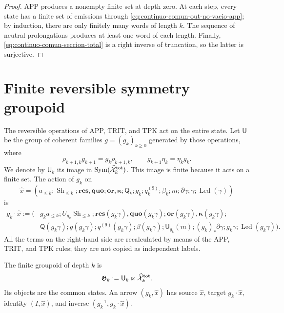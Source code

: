 \begin{proof}
APP produces a nonempty finite set at depth zero. At each step,
every state has a finite set of emissions through
\eqref{eq:continuo-comun-out-no-vacio-app}; by induction, there are only finitely many
words of length \(k\). The sequence of neutral prolongations
produces at least one word of each length. Finally,
\eqref{eq:continuo-comun-seccion-total} is a right inverse of
truncation, so the latter is surjective.
\end{proof}

\section{Finite reversible symmetry groupoid}
\label{sec:continuo-comun-groupoide}

The reversible operations of APP, TRIT, and TPK act on the entire state.
Let \(\mathsf U\) be the group of coherent families
\(g=(g_k)_{k\geq0}\) generated by those operations, where
\begin{equation}
\label{eq:continuo-comun-simetria-coherente}
 \rho_{k+1,k}g_{k+1}=g_k\rho_{k+1,k},
 \qquad
 g_{k+1}\eta_k=\eta_kg_k.
\end{equation}
We denote by \(\mathsf U_k\) its image in
\(\operatorname{Sym}(\widehat{\mathcal X}^{\rm tot}_k)\). This image is
finite because it acts on a finite set. The action of \(g_k\) on
\begin{equation*}
 \widehat x=(a_{\leq k};\operatorname{Sh}_{\leq k};
 \mathbf{res},\mathbf{quo};\mathbf{or},\mathbf\kappa;
 \mathsf Q_k;g_k;q_k^{(9)};\beta_k;m;\partial\gamma;\gamma;
 \operatorname{Led}(\gamma))
\end{equation*}
is
\begin{equation}
\label{eq:continuo-comun-accion-reversible}
\begin{aligned}
 g_k\cdot\widehat x:=\bigl(&
 g_k a_{\leq k};
 U_{g_k}\operatorname{Sh}_{\leq k};
 \mathbf{res}(g_k\gamma),\mathbf{quo}(g_k\gamma);
 \mathbf{or}(g_k\gamma),\mathbf\kappa(g_k\gamma);\\
 &\mathsf Q(g_k\gamma);g(g_k\gamma);q^{(9)}(g_k\gamma);
 \beta(g_k\gamma);
 \mathsf U_{g_k}(m);
 (g_k)_*\partial\gamma;
 g_k\gamma;
 \operatorname{Led}(g_k\gamma)\bigr).
\end{aligned}
\end{equation}
All the terms on the right-hand side are recalculated by means of the APP,
TRIT, and TPK rules; they are not copied as independent labels.

\begin{definition}
\label{def:continuo-comun-groupoide}
The finite groupoid of depth \(k\) is
\begin{equation}
\label{eq:continuo-comun-groupoide}
 \mathfrak G_k
 :=\mathsf U_k\ltimes\widehat{\mathcal X}^{\rm tot}_k.
\end{equation}
Its objects are the common states.  An arrow
\((g_k,\widehat x)\) has source \(\widehat x\), target
\(g_k\cdot\widehat x\), identity \((I,\widehat x)\), and inverse
\((g_k^{-1},g_k\cdot\widehat x)\).
\end{definition}

